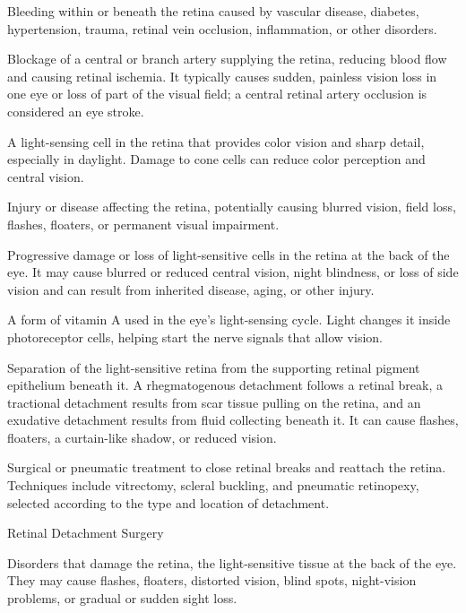  Bleeding within or beneath the retina caused by vascular disease, diabetes, hypertension, trauma, retinal vein occlusion, inflammation, or other disorders.

 Blockage of a central or branch artery supplying the retina, reducing blood flow and causing retinal ischemia. It typically causes sudden, painless vision loss in one eye or loss of part of the visual field; a central retinal artery occlusion is considered an eye stroke.

 A light-sensing cell in the retina that provides color vision and sharp detail, especially in daylight. Damage to cone cells can reduce color perception and central vision.

 Injury or disease affecting the retina, potentially causing blurred vision, field loss, flashes, floaters, or permanent visual impairment.

 Progressive damage or loss of light-sensitive cells in the retina at the back of the eye. It may cause blurred or reduced central vision, night blindness, or loss of side vision and can result from inherited disease, aging, or other injury.

 A form of vitamin A used in the eye’s light-sensing cycle. Light changes it inside photoreceptor cells, helping start the nerve signals that allow vision.

 Separation of the light-sensitive retina from the supporting retinal pigment epithelium beneath it. A rhegmatogenous detachment follows a retinal break, a tractional detachment results from scar tissue pulling on the retina, and an exudative detachment results from fluid collecting beneath it. It can cause flashes, floaters, a curtain-like shadow, or reduced vision.

 Surgical or pneumatic treatment to close retinal breaks and reattach the retina. Techniques include vitrectomy, scleral buckling, and pneumatic retinopexy, selected according to the type and location of detachment.

\synonyms
Retinal Detachment Surgery

 Disorders that damage the retina, the light-sensitive tissue at the back of the eye. They may cause flashes, floaters, distorted vision, blind spots, night-vision problems, or gradual or sudden sight loss.

